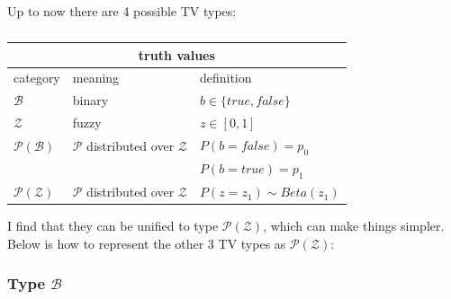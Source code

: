 Up to now there are 4 possible TV types:
\begin{table}[H]
\parbox{3cm}{\caption{}}
\begin{tabular}{|l|l|l|} \hline
\multicolumn{3}{|c|}{\textbf{truth values}}\\ \hline
category                   & meaning                                      & definition \\ \hline
$\mathcal{B}$              & binary                                       & $b \in \{true, false\} $\\
$\mathcal{Z}$              & fuzzy                                        & $z \in [0,1] $\\
$\mathcal{P}(\mathcal{B})$ & $\mathcal{P}$ distributed over $\mathcal{Z}$ & $ P(b=false) = p_0 $\\
                           &                                              & $ P(b=true) = p_1 $\\
$\mathcal{P}(\mathcal{Z})$ & $\mathcal{P}$ distributed over $\mathcal{Z}$ & $ P(z=z_1) \sim Beta(z_1) $\\ \hline
\end{tabular}
\end{table}
I find that they can be unified to type $\mathcal{P(Z)}$, which can make things simpler.  Below is how to represent the other 3 TV types as $\mathcal{P(Z)}$:

\subsubsection{Type $\mathcal{B}$}

